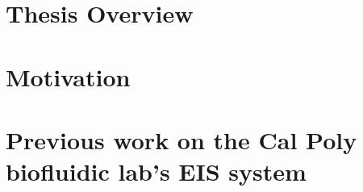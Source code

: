 \section{Thesis Overview}

\section{Motivation}

\section{Previous work on the Cal Poly biofluidic lab's EIS system}